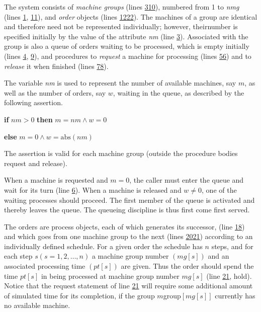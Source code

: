 \documentclass[twoside,11pt]{book}
\begin{document}
The system consists of \textit{machine groups} (lines \hyperref[pg:program-job-shop-3]{3}\textendash \hyperref[pg:program-job-shop-10]{10}), numbered from 1 to \textit{nmg} (lines \hyperref[pg:program-job-shop-1]{1}, \hyperref[pg:program-job-shop-11]{11}), and \textit{order} objects (lines \hyperref[pg:program-job-shop-12]{12}\textendash \hyperref[pg:program-job-shop-22]{22}). The machines of a group are identical and therefore need not be represented individually; however, theirnumber is specified initially by the value of the attribute \textit{nm} (line \hyperref[pg:program-job-shop-3]{3}). Associated with the group is also a queue of orders waiting to be processed, which is empty initially (lines \hyperref[pg:program-job-shop-4]{4}, \hyperref[pg:program-job-shop-9]{9}), and procedures to \textit{request} a machine for processing (lines \hyperref[pg:program-job-shop-5]{5}\textendash \hyperref[pg:program-job-shop-6]{6}) and to \textit{release} it when finished (lines \hyperref[pg:program-job-shop-7]{7}\textendash \hyperref[pg:program-job-shop-8]{8}).

The variable \textit{nm} is used to represent the number of available machines, say $m$, as well as the number of orders, say $w$, waiting in the queue, as described by the following assertion.

\quad \textbf{if} $nm > 0$ \textbf{then} $m = nm \land w = 0$

\quad \textbf{else} $m = 0 \land w = \text{abs}(nm)$

\noindent
The assertion is valid for each machine group (outside the procedure bodies request and release).

When a machine is requested and $m = 0$, the caller must enter the queue and wait for its turn (line \hyperref[pg:program-job-shop-6]{6}). When a machine is released and $w \neq 0$, one of the waiting processes should proceed. The first member of the queue is activated and thereby leaves the queue. The queueing discipline is thus first come first served.

The orders are process objects, each of which generates its successor, (line \hyperref[pg:program-job-shop-18]{18}) and which goes from one machine group to the next (lines \hyperref[pg:program-job-shop-20]{20}\textendash \hyperref[pg:program-job-shop-21]{21}) according to an individually defined schedule. For a given order the schedule has $n$ steps, and for each step $s(s = 1, 2, \dots, n)$ a machine group number $(mg[s])$ and an associated processing time $(pt[s])$ are given. Thus the order should spend the time $pt[s]$ in being processed at machine group number $mg[s]$ (line \hyperref[pg:program-job-shop-21]{21}, hold). Notice that the request statement of line \hyperref[pg:program-job-shop-21]{21} will require some additional amount of simulated time for its completion, if the group $m$group$[mg[s]]$ currently has no available machine.
\end{document}
